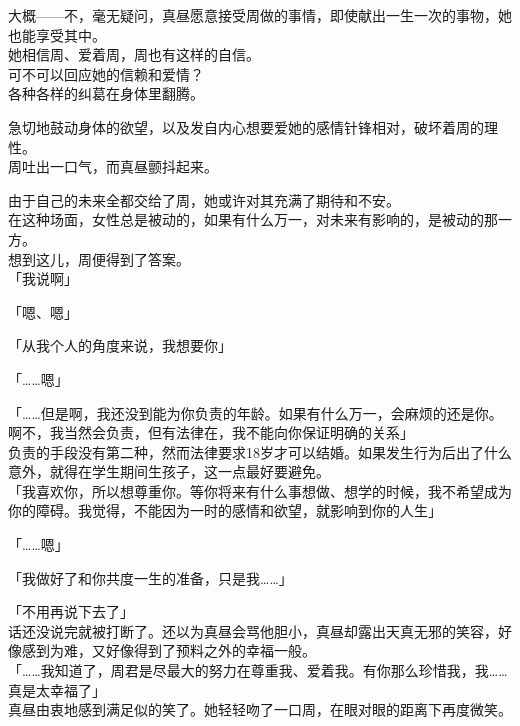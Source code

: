 大概——不，毫无疑问，真昼愿意接受周做的事情，即使献出一生一次的事物，她也能享受其中。\\

她相信周、爱着周，周也有这样的自信。\\

可不可以回应她的信赖和爱情？\\

各种各样的纠葛在身体里翻腾。

急切地鼓动身体的欲望，以及发自内心想要爱她的感情针锋相对，破坏着周的理性。\\

周吐出一口气，而真昼颤抖起来。

由于自己的未来全都交给了周，她或许对其充满了期待和不安。\\

在这种场面，女性总是被动的，如果有什么万一，对未来有影响的，是被动的那一方。\\

想到这儿，周便得到了答案。\\

「我说啊」

「嗯、嗯」

「从我个人的角度来说，我想要你」

「……嗯」

「……但是啊，我还没到能为你负责的年龄。如果有什么万一，会麻烦的还是你。啊不，我当然会负责，但有法律在，我不能向你保证明确的关系」\\

负责的手段没有第二种，然而法律要求18岁才可以结婚。如果发生行为后出了什么意外，就得在学生期间生孩子，这一点最好要避免。\\

「我喜欢你，所以想尊重你。等你将来有什么事想做、想学的时候，我不希望成为你的障碍。我觉得，不能因为一时的感情和欲望，就影响到你的人生」

「……嗯」

「我做好了和你共度一生的准备，只是我……」

「不用再说下去了」\\

话还没说完就被打断了。还以为真昼会骂他胆小，真昼却露出天真无邪的笑容，好像感到为难，又好像得到了预料之外的幸福一般。\\

「……我知道了，周君是尽最大的努力在尊重我、爱着我。有你那么珍惜我，我……真是太幸福了」\\

真昼由衷地感到满足似的笑了。她轻轻吻了一口周，在眼对眼的距离下再度微笑。\\

